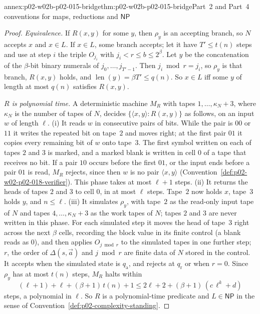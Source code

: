\begin{annexitem}{annex:p02-w02b-p02-015-bridge}{thm:p02-w02b-p02-015-bridge}{Part~2 and Part~4 conventions for maps, reductions and \(\mathsf{NP}\)}
\begin{proof}
\emph{Equivalence.}  If \(R(x,y)\) for some \(y\), then \(\rho_y\) is an
accepting branch, so \(N\) accepts \(x\) and \(x\in L\).  If \(x\in L\), some
branch accepts; let it have \(T'\leq t(n)\) steps and use at step \(i\) the
triple \(O_{j_i}\) with \(j_i<r\leq b\leq2^\beta\).  Let \(y\) be the
concatenation of the \(\beta\)-bit binary numerals of
\(j_0,\ldots,j_{T'-1}\).  Then \(j_i\bmod r=j_i\), so \(\rho_y\) is that
branch, \(R(x,y)\) holds, and \(\operatorname{len}(y)=\beta T'\leq q(n)\).
So \(x\in L\) iff some \(y\) of length at most \(q(n)\) satisfies
\(R(x,y)\).

\emph{\(R\) is polynomial time.}  A deterministic machine \(M_R\) with
tapes \(1,\ldots,\kappa_N+3\), where \(\kappa_N\) is the number of tapes of
\(N\), decides \(\{\langle x,y\rangle:R(x,y)\}\) as follows, on an input
\(w\) of length \(\ell\).  (i) It reads \(w\) in consecutive pairs of bits.
While the pair is \(00\) or \(11\) it writes the repeated bit on tape~\(2\)
and moves right; at the first pair \(01\) it copies every remaining bit of
\(w\) onto tape~\(3\).  The first symbol written on each of tapes \(2\) and
\(3\) is marked, and a marked blank is written in cell \(0\) of a tape that
receives no bit.  If a pair \(10\) occurs before the first \(01\), or the
input ends before a pair \(01\) is read, \(M_R\) rejects, since then
\(w\) is no pair \(\langle x,y\rangle\)
(Convention~\ref{def:p02-w02-p02-018-verifier}).  This phase takes at most
\(\ell+1\) steps.  (ii) It returns the heads of tapes \(2\) and \(3\) to cell
\(0\), in at most \(\ell\) steps.  Tape~\(2\) now holds \(x\), tape~\(3\)
holds \(y\), and \(n\leq\ell\).  (iii) It simulates \(\rho_y\), with tape~\(2\)
as the read-only input tape of \(N\) and tapes \(4,\ldots,\kappa_N+3\) as the
work tapes of \(N\); tapes \(2\) and \(3\) are never written in this phase.
For each simulated step it moves the head of tape~\(3\) right across the next
\(\beta\) cells, recording the block value in its finite control (a blank
reads as \(0\)), and then applies \(O_{j\bmod r}\) to the simulated tapes in
one further step; \(r\), the order of \(\Delta(s,\vec a)\) and \(j\bmod r\)
are finite data of \(N\) stored in the control.  It accepts when the
simulated state is \(q_{\mathrm a}\), and rejects at \(q_{\mathrm r}\) or
when \(r=0\).  Since \(\rho_y\) has at most \(t(n)\) steps, \(M_R\) halts
within
\[
 (\ell+1)+\ell+(\beta+1)\,t(n)+1\leq 2\ell+2+(\beta+1)\,(c\,\ell^k+d)
\]
steps, a polynomial in \(\ell\).  So \(R\) is a polynomial-time predicate and
\(L\in\mathsf{NP}\) in the sense of
Convention~\ref{def:p02-complexity-standing}.


\end{proof}
\end{annexitem}
